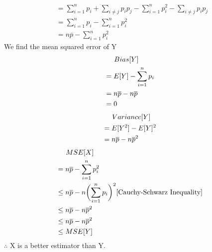 \documentclass[12pt,letterpaper,fleqn]{article}
\begin{document}
\begin{flushleft}
\begin{equation}
\begin{split}
      &= \sum_{i=1}^n p_i + \sum_{i \neq j} p_i p_j - \sum_{i=1}^n p_i^2 - \sum_{i \neq j} p_i p_j\\
      &= \sum_{i=1}^n p_i - \sum_{i=1}^n p_i^2\\
      &= n \overline{p} - \sum_{i=1}^n p_i^2
    \end{split}
  \end{equation}
  We find the mean squared error of Y
  \begin{equation}
    \begin{split}
      &\hspace{1.4em}Bias[Y]\\
      &= E[Y] - \sum_{i=1}^n p_i\\
      &= n\overline{p} - n\overline{p}\\
      &= 0
    \end{split}
  \end{equation}
  \begin{equation}
    \begin{split}
      &\hspace{1.4em}Variance[Y]\\
      &= E[Y^2] - E[Y]^2\\
      &= n\overline{p} - n\overline{p}^2
    \end{split}
  \end{equation}
  \begin{equation}
    \begin{split}
      &\hspace{1.4em}MSE[X]\\
      &= n \overline{p} - \sum_{i=1}^n p_i^2\\
      &\leq n \overline{p} - n \biggl(\sum_{i=1}^n p_i\biggr)^2 \hfill[\text{Cauchy-Schwarz Inequality}]\\
      &\leq n \overline{p} - n \overline{p}^2\\
      &\leq n \overline{p} - n \overline{p}^2\\
      &\leq MSE[Y]
    \end{split}
  \end{equation}
  $\therefore$ X is a better estimator than Y.
\end{flushleft}
\end{document}
